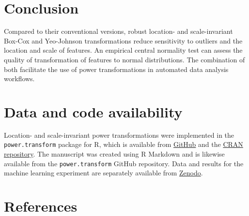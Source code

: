 \documentclass[
  a4paper,
]{article}
\begin{document}
\section{Conclusion}\label{conclusion}

Compared to their conventional versions, robust location- and
scale-invariant Box-Cox and Yeo-Johnson transformations reduce
sensitivity to outliers and the location and scale of features. An
empirical central normality test can assess the quality of
transformation of features to normal distributions. The combination of
both facilitate the use of power transformations in automated data
analysis workflows.

\section{Data and code availability}\label{data-and-code-availability}

Location- and scale-invariant power transformations were implemented in
the \texttt{power.transform} package for R, which is available from
\href{https://github.com/oncoray/power.transform}{GitHub} and the
\href{https://cran.r-project.org/package=power.transform}{CRAN
repository}. The manuscript was created using R Markdown and is likewise
available from the \texttt{power.transform} GitHub repository. Data and
results for the machine learning experiment are separately available
from \href{https://doi.org/10.5281/zenodo.14986689}{Zenodo}.

\section*{References}\label{references}
\end{document}
